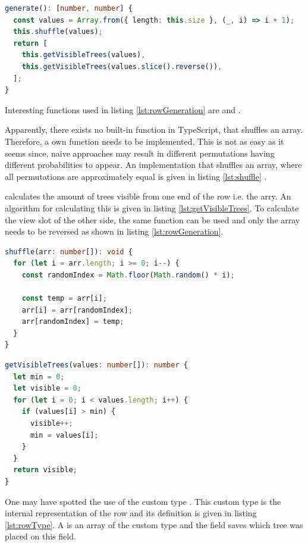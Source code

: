 \begin{lstlisting}[language=TypeScript,caption={Algorithm to generate a row of trees exercise instance of \code{this.size}},label={lst:rowGeneration}]
generate(): [number, number] {
  const values = Array.from({ length: this.size }, (_, i) => i + 1);
  this.shuffle(values);
  return [
    this.getVisibleTrees(values),
    this.getVisibleTrees(values.slice().reverse()),
  ];
}
\end{lstlisting}

Interesting functions used in listing \ref{lst:rowGeneration} are  and . 

Apparently, there exists no built-in function in TypeScript, that shuffles an array. Therefore, a own function needs to be implemented. This is not as easy as it seems since, naive approaches may result in different permutations having different probabilities to appear. An implementation that shuffles an array, where all permutations are approximately equal is given in listing \ref{lst:shuffle} \cite{JavaScriptShuffle}.

 calculates the amount of trees visible from one end of the row i.e. the arry. An algorithm for calculating this is given in listing \ref{lst:getVisibleTrees}. To calculate the view slot of the other side, the same function can be used and only the array needs to be reversed as shown in listing \ref{lst:rowGeneration}.

\begin{lstlisting}[language=TypeScript,caption={Algorithm to shuffle an array},label={lst:shuffle}]
shuffle(arr: number[]): void {
  for (let i = arr.length; i >= 0; i--) {
    const randomIndex = Math.floor(Math.random() * i);

    const temp = arr[i];
    arr[i] = arr[randomIndex];
    arr[randomIndex] = temp;
  }
}
\end{lstlisting}

\begin{lstlisting}[language=TypeScript,caption={Algorithm to calculate the amount of visible tree from one end},label={lst:getVisibleTrees}]
getVisibleTrees(values: number[]): number {
  let min = 0;
  let visible = 0;
  for (let i = 0; i < values.length; i++) {
    if (values[i] > min) {
      visible++;
      min = values[i];
    }
  }
  return visible;
}
\end{lstlisting}

One may have spotted the use of the custom type . This custom type is the internal representation of the row and its definition is given in listing \ref{lst:rowType}. A  is an array of the custom type  and the field  saves which tree was placed on this field.

